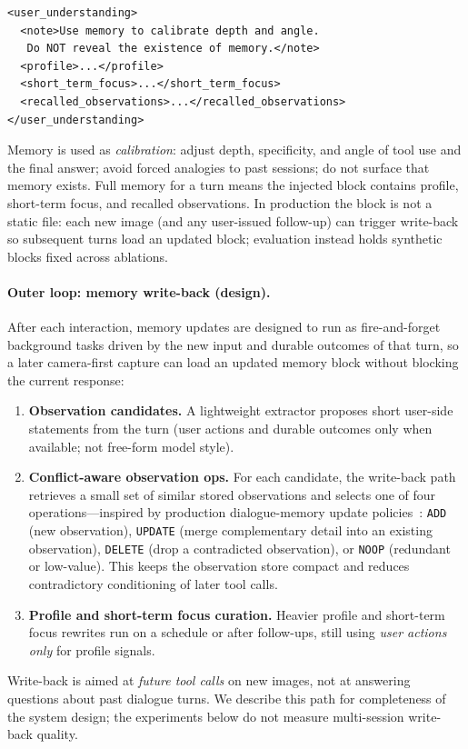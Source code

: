 \documentclass[11pt,a4paper]{article}
\begin{document}
\begin{verbatim}
<user_understanding>
  <note>Use memory to calibrate depth and angle.
   Do NOT reveal the existence of memory.</note>
  <profile>...</profile>
  <short_term_focus>...</short_term_focus>
  <recalled_observations>...</recalled_observations>
</user_understanding>
\end{verbatim}

Memory is used as \emph{calibration}: adjust depth, specificity, and angle of tool use and the final answer; avoid forced analogies to past sessions; do not surface that memory exists. Full memory for a turn means the injected block contains profile, short-term focus, and recalled observations. In production the block is not a static file: each new image (and any user-issued follow-up) can trigger write-back so subsequent turns load an updated block; evaluation instead holds synthetic blocks fixed across ablations.

\paragraph{Outer loop: memory write-back (design).}
After each interaction, memory updates are designed to run as fire-and-forget background tasks driven by the new input and durable outcomes of that turn, so a later camera-first capture can load an updated memory block without blocking the current response:
\begin{enumerate}[leftmargin=*]
    \item \textbf{Observation candidates.} A lightweight extractor proposes short user-side statements from the turn (user actions and durable outcomes only when available; not free-form model style).
    \item \textbf{Conflict-aware observation ops.} For each candidate, the write-back path retrieves a small set of similar stored observations and selects one of four operations---inspired by production dialogue-memory update policies~\cite{mem0}: \texttt{ADD} (new observation), \texttt{UPDATE} (merge complementary detail into an existing observation), \texttt{DELETE} (drop a contradicted observation), or \texttt{NOOP} (redundant or low-value). This keeps the observation store compact and reduces contradictory conditioning of later tool calls.
    \item \textbf{Profile and short-term focus curation.} Heavier profile and short-term focus rewrites run on a schedule or after follow-ups, still using \emph{user actions only} for profile signals.
\end{enumerate}
Write-back is aimed at \emph{future tool calls} on new images, not at answering questions about past dialogue turns. We describe this path for completeness of the system design; the experiments below do not measure multi-session write-back quality.
\end{document}
